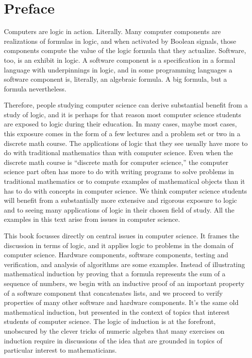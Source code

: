 \chapter{Preface}
\label{ch:Preface}

Computers are logic in action. Literally.
Many computer components are realizations of formulas in logic,
and when activated by Boolean signals, those components
compute the value of the logic formula that they actualize.
Software, too, is an exhibit in logic.
A software component is a specification in a formal language
with underpinnings in logic,
and in some programming languages a software component
is, literally, an algebraic formula.
A big formula, but a formula nevertheless.

Therefore, people studying computer science
can derive substantial benefit from a study of logic,
and it is perhaps for that reason most computer science students
are exposed to logic during their education.
In many cases, maybe most cases, this exposure comes
in the form of a few lectures and a problem set or two
in a discrete math course. The applications of logic that
they see usually have more to do with traditional mathematics
than with computer science. Even when the discrete math course
is ``discrete math for computer science,'' the computer science
part often has more to do with writing programs to solve problems
in traditional mathematics or to compute examples of
mathematical objects than it has to do with
concepts in computer science.
We think computer science students will
benefit from a substantially more extensive and rigorous
exposure to logic and to seeing many applications of
logic in their chosen field of study.
All the examples in this text arise from issues in computer science.

This book focusses directly on central issues
in computer science.
It frames the discussion in terms of logic,
and it applies logic to problems in the domain of computer science.
Hardware components, software components,
testing and verification, and analysis of algorithms
are some examples.
Instead of illustrating mathematical induction by proving
that a formula represents the sum of a sequence of numbers,
we begin with an inductive proof of an important property of
a software component that concatenates lists,
and we proceed to verify properties of
many other software and hardware components.
It's the same old mathematical induction, but presented
in the context of topics that interest
students of computer science.
The logic of induction is at the forefront,
unobscured by the clever tricks of numeric algebra
that many exercises on induction require in
discussions of the idea that are grounded in topics
of particular interest to mathematicians.

